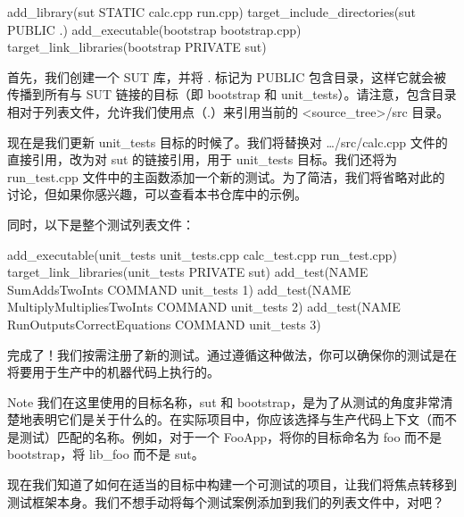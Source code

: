 \begin{cmake}
add_library(sut STATIC calc.cpp run.cpp)
target_include_directories(sut PUBLIC .)
add_executable(bootstrap bootstrap.cpp)
target_link_libraries(bootstrap PRIVATE sut)
\end{cmake}

首先，我们创建一个 SUT 库，并将 . 标记为 PUBLIC 包含目录，这样它就会被传播到所有与 SUT 链接的目标（即 bootstrap 和 unit\_tests）。请注意，包含目录相对于列表文件，允许我们使用点（.）来引用当前的 <source\_tree>/src 目录。

现在是我们更新 unit\_tests 目标的时候了。我们将替换对 …/src/calc.cpp 文件的直接引用，改为对 sut 的链接引用，用于 unit\_tests 目标。我们还将为 run\_test.cpp 文件中的主函数添加一个新的测试。为了简洁，我们将省略对此的讨论，但如果你感兴趣，可以查看本书仓库中的示例。

同时，以下是整个测试列表文件：


\begin{cmake}
add_executable(unit_tests
               unit_tests.cpp
               calc_test.cpp
               run_test.cpp)
target_link_libraries(unit_tests PRIVATE sut)
add_test(NAME SumAddsTwoInts COMMAND unit_tests 1)
add_test(NAME MultiplyMultipliesTwoInts COMMAND unit_tests 2)
add_test(NAME RunOutputsCorrectEquations COMMAND unit_tests 3)
\end{cmake}

完成了！我们按需注册了新的测试。通过遵循这种做法，你可以确保你的测试是在将要用于生产中的机器代码上执行的。

\begin{myNotic}{Note}
我们在这里使用的目标名称，sut 和 bootstrap，是为了从测试的角度非常清楚地表明它们是关于什么的。在实际项目中，你应该选择与生产代码上下文（而不是测试）匹配的名称。例如，对于一个 FooApp，将你的目标命名为 foo 而不是 bootstrap，将 lib\_foo 而不是 sut。
\end{myNotic}

现在我们知道了如何在适当的目标中构建一个可测试的项目，让我们将焦点转移到测试框架本身。我们不想手动将每个测试案例添加到我们的列表文件中，对吧？








































